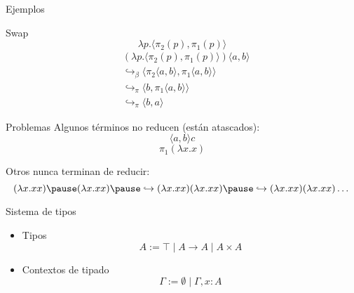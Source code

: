 \begin{frame}{Ejemplos}	
	\begin{exampleblock}{Swap}
		\[ \lambda p. \langle \pi_2 (p), \pi_1 (p) \rangle \]
		\begin{align*}
			&(\lambda p. \langle \pi_2 (p), \pi_1 (p) \rangle) \langle a,b \rangle \\
			&\hookrightarrow_\beta \langle \pi_2 \langle a,b \rangle, \pi_1 \langle a,b \rangle \rangle \\
			&\hookrightarrow_\pi \langle b, \pi_1 \langle a,b \rangle \rangle \\
			&\hookrightarrow_\pi \langle b, a \rangle
		\end{align*}
	\end{exampleblock}
\end{frame}

\begin{frame}{Problemas}
	Algunos términos no reducen (están atascados):
	\[ \langle a, b \rangle c \]
	\[ \pi_1(\lambda x.x) \]
	
	\pause
	
	Otros nunca terminan de reducir:
	\[ (\lambda x.xx) \pause (\lambda x.xx) \pause
	\hookrightarrow (\lambda x.xx)(\lambda x.xx) \pause
	\hookrightarrow (\lambda x.xx)(\lambda x.xx) \dots \]
\end{frame}

\begin{frame}{Sistema de tipos}
	\begin{itemize}[<+->]
		\item Tipos
		\[ A := \top \mid A \rightarrow A \mid A \times A \]
		
		\item Contextos de tipado
		\[ \Gamma := \emptyset \mid \Gamma, x:A \]
	\end{itemize}
\end{frame}

